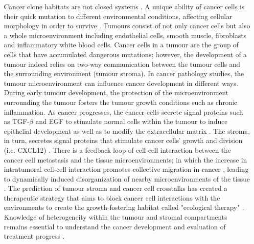 Cancer clone habitats are not closed systems \cite{greaves2012clonal}. A unique ability of cancer cells is their quick mutation to different environmental conditions, affecting cellular morphology in order to survive \cite{clark2015modes}. Tumours consist of not only cancer cells but also a whole microenvironment including endothelial cells, smooth muscle, fibroblasts and inflammatory white blood cells. Cancer cells in a tumour are the group of cells that have accumulated dangerous mutations; however, the development of a tumour indeed relies on two-way communication between the tumour cells and the surrounding environment (tumour stroma). In cancer pathology studies, the tumour microenvironment can influence cancer development in different ways. During early tumour development, the protection of the microenvironment surrounding the tumour fosters the tumour growth conditions such as chronic inflammation. As cancer progresses, the cancer cells secrete signal proteins such as TGF-$\beta$ and EGF to stimulate normal cells within the tumour to induce epithelial development as well as to modify the extracellular matrix \cite{beck2011systematic,BREMNES2011209}. The stroma, in turn, secretes signal proteins that stimulate cancer cells' growth and division (i.e. CXCL12) \cite{kumar2018analysis,wang2017role}. There is a feedback loop of cell-cell interaction between the cancer cell metastasis and the tissue microenvironments; in which the increase in intratumoral cell-cell interaction promotes collective migration in cancer \cite{friedl2011cancer, whiteside2008tumor}, leading to dynamically induced disorganization of nearby microenvironments of the tissue \cite{friedl2012classifying, canel2013cadherin, almendro2013cellular, roussos2011chemotaxis, zervantonakis2012three}. The prediction of tumour stroma and cancer cell crosstalks has created a therapeutic strategy that aims to block cancer cell interactions with the environments to create the growth-fostering habitat called "ecological therapy" \cite{pienta2008ecological, calabrese2007perivascular, bissell2011don}. Knowledge of heterogeneity within the tumour and stromal compartments remains essential to understand the cancer development and evaluation of treatment progress \cite{pages2010immune}.

